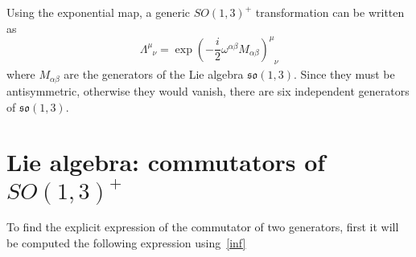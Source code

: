     Using the exponential map, a generic $SO(1,3)^+$ transformation can be written as
    \begin{equation*}
        \Lambda^{\mu}_{\phantom \mu \nu} = \exp(- \frac{i}{2} \omega^{\alpha \beta} M_{\alpha \beta})^\mu_{\phantom \mu \nu}
    \end{equation*}
    where $M_{\alpha \beta}$ are the generators of the Lie algebra $\mathfrak{so} (1,3)$. Since they must be antisymmetric, otherwise they would vanish, there are six independent generators of $\mathfrak{so} (1,3)$.
    

\section{Lie algebra: commutators of $SO(1,3)^+$}

    To find the explicit expression of the commutator of two generators, first it will be computed the following expression using~\eqref{inf}

